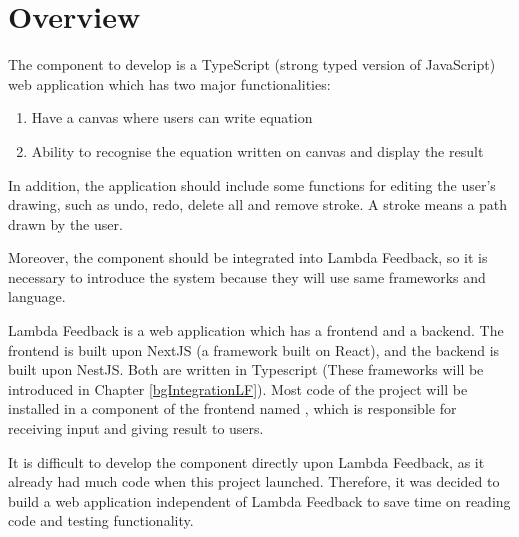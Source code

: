 \documentclass[12pt,twoside]{report}
\begin{document}
\section*{Overview}
\label{bgOverview}

The component to develop is a TypeScript (strong typed version of JavaScript) web application which has two major functionalities:
\begin{enumerate}
    \item Have a canvas where users can write equation
    \item Ability to recognise the equation written on canvas and display the result
\end{enumerate}

In addition, the application should include some functions for editing the user's drawing, such as undo, redo, delete all and remove stroke. A stroke means a path drawn by the user. 

Moreover, the component should be integrated into Lambda Feedback, so it is necessary to introduce the system because they will use same frameworks and language.

Lambda Feedback is a web application which has a frontend and a backend.
The frontend is built upon NextJS (a framework built on React), and the backend is built upon NestJS. Both
are written in Typescript (These frameworks will be introduced in Chapter \ref{bgIntegrationLF}). Most code of the project will be installed in a component of the frontend named , which is responsible for receiving input and giving result to users.

It is difficult to develop the component directly upon Lambda Feedback, as it
already had much code when this project launched. Therefore, it was decided to
build a web application independent of Lambda Feedback to save time on reading
code and testing functionality.
\end{document}

